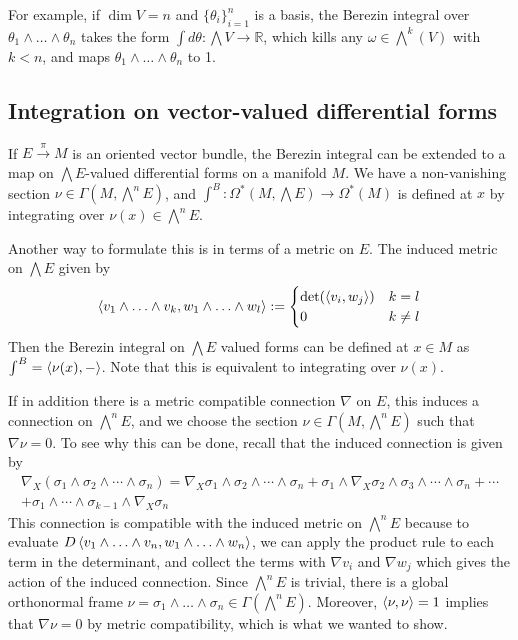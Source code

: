 For example, if $\dim V = n$ and $\{\theta_i\}_{i=1}^n$ is a basis, the
Berezin integral over $\theta_1\wedge\ldots\wedge \theta_n$ takes the form 
$\int d\theta : \bigwedge V \to \mathbb{R}$, 
which kills any $\omega\in \bigwedge^k(V)$ with  $k<n$, and maps 
 $\theta_1\wedge \ldots\wedge\theta_n$ to 1.

\subsection{Integration on vector-valued differential forms}
If $E\xrightarrow{\pi} M$ is an oriented vector bundle, the Berezin integral
can be extended to a map on $\bigwedge E$-valued differential forms on a 
manifold $M$. We have a
non-vanishing section  $\nu\in \Gamma(M,\bigwedge^n E)$, and 
$\int^B : \Omega^*(M,\bigwedge E) \to \Omega^*(M)$ is defined at $x$ by
integrating over $\nu(x)\in \bigwedge^n E$. 

Another way to formulate this is in terms of a metric on $E$. The induced
metric on  $\bigwedge E$ given by 
\[
	\gen{v_1\wedge\ldots\wedge v_k, w_1\wedge\ldots\wedge w_l} 
	:= 
	\begin{cases}
		\det(\gen{v_i,w_j})	& k=l \\
		0 & k \neq l
	\end{cases}
\] 
Then the Berezin integral on $\bigwedge E$ valued forms can be defined at $x\in
M$ as $\int^B = \gen{\nu(x),-}$. Note that this is equivalent to integrating over 
$\nu(x)$. 

If in addition there is a metric compatible connection $\nabla$ on $E$, this 
induces a connection on $\bigwedge^n E$, and we choose the section
$\nu\in\Gamma(M,\bigwedge^n E)$ such that $\nabla \nu = 0$. 
To see why this can be done, recall that the induced connection is given by
\begin{multline*}
	\nabla_X(\sigma_1\wedge\sigma_2\wedge\cdots\wedge\sigma_n) 
	= \nabla_X \sigma_1
\wedge \sigma_2 \wedge \cdots \wedge \sigma_n + \sigma_1 \wedge \nabla_X\sigma_2
\wedge \sigma_3 \wedge \cdots \wedge \sigma_n + \cdots \\
+ \sigma_1 \wedge \cdots \wedge \sigma_{k-1}\wedge \nabla_X \sigma_n
\end{multline*}
This connection is compatible with the induced metric on $\bigwedge^nE$ because
to evaluate $D \gen{v_1\wedge\ldots\wedge v_n,w_1\wedge\ldots\wedge w_n}$, 
we can apply the product rule to each term in the determinant, and collect the
terms with $\nabla v_i$ and $\nabla w_j$ which gives the action of the induced
connection. Since $\bigwedge^n E$ is trivial, there is a global orthonormal
frame  $\nu=\sigma_1\wedge\ldots\wedge\sigma_n \in \Gamma(\bigwedge^nE)$. 
Moreover, $\gen{\nu,\nu}=1$ implies that $\nabla \nu = 0$ by metric
compatibility, which is what we wanted to show.

